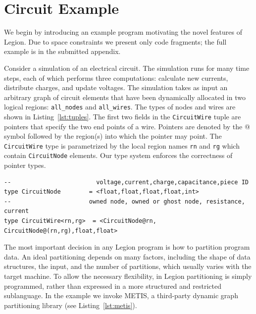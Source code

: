 
\section{Circuit Example}
\label{sec:example}


We begin by introducing an example program 
motivating the novel features of Legion.
Due to space constraints we present only code fragments;
the full example is in the submitted appendix.

Consider a simulation of an electrical circuit.
The simulation runs for many time steps, each of which performs three computations:
 calculate new currents, distribute charges, and update voltages.
The simulation takes as input an arbitrary graph of circuit elements
that have been dynamically allocated in two logical regions: {\tt all\_nodes} 
and {\tt all\_wires}.  The types of nodes and wires are 
shown in Listing~\ref{lst:tuples}.  The first two fields in the
{\tt CircuitWire} tuple are pointers that specify the two end points of
a wire.  Pointers are denoted by the @ symbol
followed by the region(s) into which the pointer may point.
The {\tt CircuitWire} type is parametrized by the local region
names {\tt rn} and {\tt rg} which contain {\tt CircuitNode} elements.
Our type system enforces the correctness of pointer types.

\begin{lstlisting}[label={lst:tuples},caption={Tuples and Pointers Example}]
--                        voltage,current,charge,capacitance,piece ID
type CircuitNode        = <float,float,float,float,int>
--                      owned node, owned or ghost node, resistance, current
type CircuitWire<rn,rg>  = <CircuitNode@rn, CircuitNode@(rn,rg),float,float>
\end{lstlisting}

The most important decision in any Legion program is how to partition
program data.  An ideal partitioning depends on many factors,
including the shape of data structures, the input, and the number of
partitions, which usually varies with the target machine.  To allow
the necessary flexibility, in Legion partitioning is simply programmed,
rather than expressed in a more structured and restricted
sublanguage.  In the example we invoke METIS\cite{Metis98}, a 
third-party dynamic graph partitioning library (see Listing~\ref{lst:metis}).

